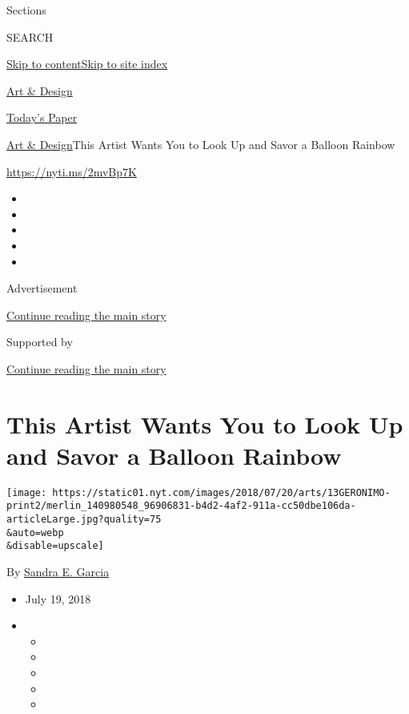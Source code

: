 Sections

SEARCH

\protect\hyperlink{site-content}{Skip to
content}\protect\hyperlink{site-index}{Skip to site index}

\href{https://www.nytimes.com/section/arts/design}{Art \& Design}

\href{https://myaccount.nytimes.com/auth/login?response_type=cookie\&client_id=vi}{}

\href{https://www.nytimes.com/section/todayspaper}{Today's Paper}

\href{/section/arts/design}{Art \& Design}\textbar{}This Artist Wants
You to Look Up and Savor a Balloon Rainbow

\href{https://nyti.ms/2mvBp7K}{https://nyti.ms/2mvBp7K}

\begin{itemize}
\item
\item
\item
\item
\item
\end{itemize}

Advertisement

\protect\hyperlink{after-top}{Continue reading the main story}

Supported by

\protect\hyperlink{after-sponsor}{Continue reading the main story}

\hypertarget{this-artist-wants-you-to-look-up-and-savor-a-balloon-rainbow}{%
\section{This Artist Wants You to Look Up and Savor a Balloon
Rainbow}\label{this-artist-wants-you-to-look-up-and-savor-a-balloon-rainbow}}

\texttt{[image: https://static01.nyt.com/images/2018/07/20/arts/13GERONIMO-print2/merlin\_140980548\_96906831-b4d2-4af2-911a-cc50dbe106da-articleLarge.jpg?quality=75\\\&auto=webp\\\&disable=upscale]}

By \href{https://www.nytimes.com/by/sandra-e-garcia}{Sandra E. Garcia}

\begin{itemize}
\item
  July 19, 2018
\item
  \begin{itemize}
  \item
  \item
  \item
  \item
  \item
  \end{itemize}
\end{itemize}

